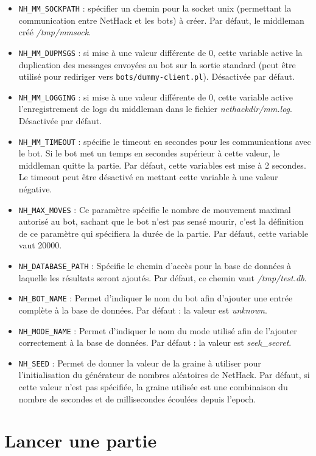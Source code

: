 \documentclass[10pt,a4paper]{report}
\begin{document}
\begin{itemize}
\item \verb!NH_MM_SOCKPATH! : spécifier un chemin pour la socket unix (permettant la communication entre NetHack et les bots) à créer. Par défaut, le middleman créé \emph{/tmp/mmsock}.
\item \verb!NH_MM_DUPMSGS! : si mise à une valeur différente de 0, cette
	variable active la duplication des messages envoyées au bot sur la sortie
	standard (peut être utilisé pour rediriger vers \verb!bots/dummy-client.pl!).
	Désactivée par défaut.
\item \verb!NH_MM_LOGGING! : si mise à une valeur différente de 0, cette variable active l'enregistrement de logs du middleman dans le fichier \emph{nethackdir/mm.log}. Désactivée par défaut.
\item \verb!NH_MM_TIMEOUT! : spécifie le timeout en secondes pour les communications avec le bot. Si le bot met un temps en secondes supérieur à cette valeur, le middleman quitte la partie. Par défaut, cette variables est mise à 2 secondes. Le timeout peut être désactivé en mettant cette variable à une valeur négative.
\item \verb!NH_MAX_MOVES! :
  Ce paramètre spécifie le nombre de mouvement maximal autorisé au bot, sachant
  que le bot n'est pas sensé mourir, c'est la définition de ce paramètre qui
  spécifiera la durée de la partie. Par défaut, cette variable vaut 20000.
\item \verb!NH_DATABASE_PATH! :
  Spécifie le chemin d'accès pour la base de données à laquelle les résultats
  seront ajoutés. Par défaut, ce chemin vaut \emph{/tmp/test.db}.
\item \verb!NH_BOT_NAME! :
  Permet d'indiquer le nom du bot afin d'ajouter une entrée complète à la base
  de données. Par défaut : la valeur est \emph{unknown}.
\item \verb!NH_MODE_NAME! :
  Permet d'indiquer le nom du mode utilisé afin de l'ajouter correctement à la
  base de données. Par défaut : la valeur est \emph{seek\_secret}.
\item \verb!NH_SEED! :
  Permet de donner la valeur de la graine à utiliser pour l'initialisation du
  générateur de nombres aléatoires de NetHack. Par défaut, si cette
  valeur n'est pas spécifiée, la graine utilisée est une combinaison du nombre
  de secondes et de millisecondes écoulées depuis l'epoch.
\end{itemize}

\section{Lancer une partie}
\end{document}
